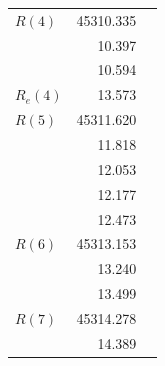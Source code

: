 \documentclass[12pt]{mitthesis}
\begin{document}
\begin{table}
{\begin{tabular}[t]{l r l}
      $R(4)$ 
      & 45310.335 \\
      &    10.397 \\
      &    10.594 \\[5pt]

      $R_e(4)$
      &    13.573 \\[12pt]

      $R(5)$ 
      & 45311.620 \\
      &    11.818 \\
      &    12.053 \\
      &    12.177 \\
      &    12.473 \\[12pt]

      $R(6)$ 
      & 45313.153 \\
      &    13.240 \\
      &    13.499 \\[12pt]

      $R(7)$ 
      & 45314.278 \\
      &    14.389 \\
      \bottomrule
    \end{tabular}
  }
\end{table}
\end{document}
